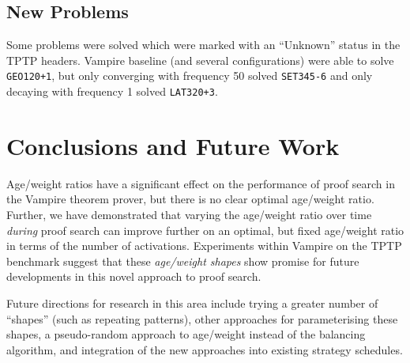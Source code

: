 \documentclass{llncs}
\begin{document}
\subsection{New Problems}
Some problems were solved which were marked with an ``Unknown'' status in the TPTP headers.
Vampire baseline (and several configurations) were able to solve \texttt{GEO120+1}, but only converging with frequency 50 solved \texttt{SET345-6} and only decaying with frequency 1 solved \texttt{LAT320+3}.


\section{Conclusions and Future Work}
\label{sec:conclusions}
Age/weight ratios have a significant effect on the performance of proof search in the Vampire theorem prover, but there is no clear optimal age/weight ratio.
Further, we have demonstrated that varying the age/weight ratio over time \emph{during} proof search can improve further on an optimal, but fixed age/weight ratio in terms of the number of activations.
Experiments within Vampire on the TPTP benchmark suggest that these \emph{age/weight shapes} show promise for future developments in this novel approach to proof search.

Future directions for research in this area include trying a greater number of ``shapes'' (such as repeating patterns), other approaches for parameterising these shapes, a pseudo-random approach to age/weight instead of the balancing algorithm, and integration of the new approaches into existing strategy schedules.


\end{document}
